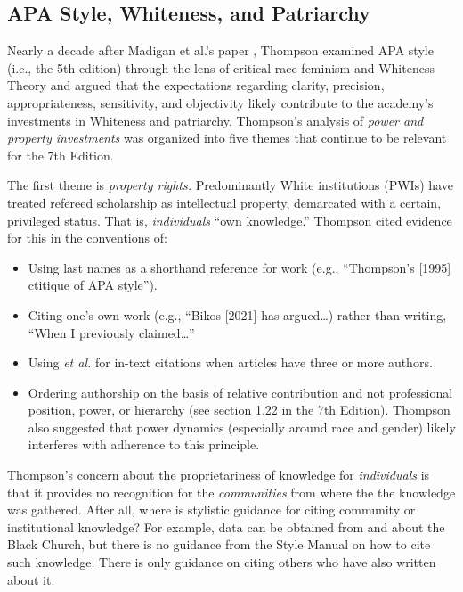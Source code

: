 \documentclass[
  11pt,
]{book}
\providecommand{\tightlist}{%
  \setlength{\itemsep}{0pt}\setlength{\parskip}{0pt}}
\begin{document}
\hypertarget{apa-style-whiteness-and-patriarchy}{%
\subsection{APA Style, Whiteness, and Patriarchy}\label{apa-style-whiteness-and-patriarchy}}

Nearly a decade after Madigan et al.'s paper \citeyearpar{madigan_language_1995}, Thompson \citeyearpar{thompson_gentlemanly_2004} examined APA style (i.e., the 5th edition) through the lens of critical race feminism and Whiteness Theory and argued that the expectations regarding clarity, precision, appropriateness, sensitivity, and objectivity likely contribute to the academy's investments in Whiteness and patriarchy. Thompson's analysis of \emph{power and property investments} was organized into five themes that continue to be relevant for the 7th Edition.

The first theme is \emph{property rights.} Predominantly White institutions (PWIs) have treated refereed scholarship as intellectual property, demarcated with a certain, privileged status. That is, \emph{individuals} ``own knowledge.'' Thompson \citeyearpar{thompson_gentlemanly_2004} cited evidence for this in the conventions of:

\begin{itemize}
\tightlist
\item
  Using last names as a shorthand reference for work (e.g., ``Thompson's {[}1995{]} ctitique of APA style'').
\item
  Citing one's own work (e.g., ``Bikos {[}2021{]} has argued\ldots) rather than writing, ``When I previously claimed\ldots{}''
\item
  Using \emph{et al.} for in-text citations when articles have three or more authors.
\item
  Ordering authorship on the basis of relative contribution and not professional position, power, or hierarchy (see section 1.22 in the 7th Edition). Thompson \citeyearpar{thompson_gentlemanly_2004} also suggested that power dynamics (especially around race and gender) likely interferes with adherence to this principle.
\end{itemize}

Thompson's \citeyearpar{thompson_gentlemanly_2004} concern about the proprietariness of knowledge for \emph{individuals} is that it provides no recognition for the \emph{communities} from where the the knowledge was gathered. After all, where is stylistic guidance for citing community or institutional knowledge? For example, data can be obtained from and about the Black Church, but there is no guidance from the Style Manual on how to cite such knowledge. There is only guidance on citing others who have also written about it.
\end{document}
